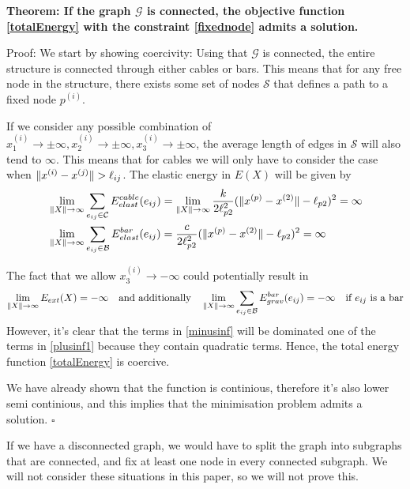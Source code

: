 \textbf{Theorem: If the graph $\mathcal{G}$ is connected, the objective function \eqref{totalEnergy} with the constraint \eqref{fixednode} admits a solution.}

Proof:
We start by showing coercivity:
Using that $\mathcal{G}$ is connected, the entire structure is connected through either cables or bars. This means that for any free node in the structure, there exists some set of nodes $\mathcal{S}$ that defines a path to a fixed node $p^{(i)}$. 

If we consider any possible combination of $x^{(i)}_1 \to \pm \infty,x^{(i)}_2 \to \pm \infty,x^{(i)}_3 \to \pm \infty$, the average length of edges in $\mathcal{S}$ will also tend to $\infty$. This means that for cables we will only have to consider the case when $\lVert x^{(i)} - x^{(j)}\rVert > \ell_{ij}$. The elastic energy in $E(X)$ will be given by
\begin{equation} 
\label{plusinf1}
\begin{aligned}
     &\lim\limits_{\rVert X \lVert \to \infty} \sum\limits_{e_{ij} \in \mathcal{C}}E^{cable}_{elast}(e_{ij}) =\lim\limits_{\rVert X \lVert \to \infty} \frac{k}{2 \ell_{p2}^2}(\lVert x^{(p)} - x^{(2)} \rVert-\ell_{p2})^2 = \infty \\
     &\lim\limits_{\rVert X \lVert \to \infty} \sum\limits_{e_{ij} \in \mathcal{B }}E^{bar}_{elast}(e_{ij}) = 
      \frac{c}{2 \ell_{p2}^2}(\lVert x^{(p)} - x^{(2)} \rVert-\ell_{p2})^2 = \infty
\end{aligned} 
\end{equation}

The fact that we allow $x^{(i)}_3 \to -\infty$ could potentially result in
\begin{equation}
  \lim\limits_{\rVert X \lVert \to \infty} E_{ext}(X) = -\infty
\quad\text{and additionally}\quad
\lim\limits_{\rVert X \lVert \to \infty} \sum\limits_{e_{ij} \in \mathcal{B}} E^{bar}_{grav}(e_{ij}) = -\infty \quad \text{if $e_{ij}$ is a bar}
\label{minusinf}
\end{equation} 
However, it's clear that the terms in \eqref{minusinf} will be dominated one of the terms in \eqref{plusinf1} because they contain quadratic terms. Hence, the total energy function \eqref{totalEnergy} is coercive.

We have already shown that the function is continious, therefore it's also lower semi continious, and this implies that the minimisation problem admits a solution. $\square$

If we have a disconnected graph, we would have to split the graph into subgraphs that are connected, and fix at least one node in every connected subgraph. We will not consider these situations in this paper, so we will not prove this.


